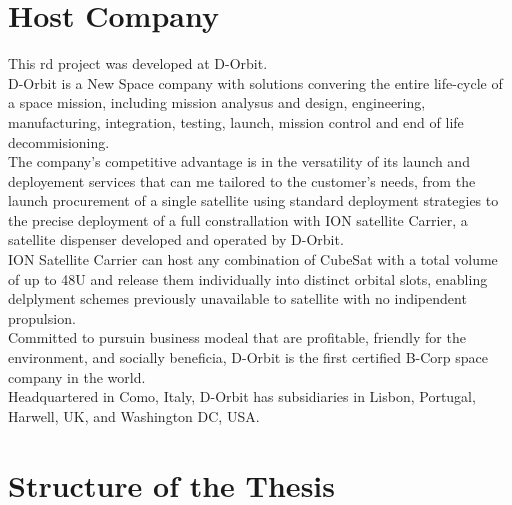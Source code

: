\section{Host Company}
This \acrshort{rd} project was developed at D-Orbit.\\
D-Orbit is a New Space company with solutions convering the entire life-cycle of a space mission, including mission analysus and design, engineering, manufacturing, integration, testing, launch, mission control and end of life decommisioning.\\
The company's competitive advantage is in the versatility of its launch and deployement services that can me tailored to the customer's needs, from the launch procurement of a single satellite using standard deployment strategies to the precise deployment of a full constrallation with ION satellite Carrier, a satellite dispenser developed and operated by D-Orbit.\\
ION Satellite Carrier can host any combination of CubeSat with a total volume of up to 48U and release them individually into distinct orbital slots, enabling delplyment schemes previously unavailable to satellite with no indipendent propulsion.\\
Committed to pursuin business modeal that are profitable, friendly for the environment, and socially beneficia, D-Orbit is the first certified B-Corp space company in the world.\\
Headquartered in Como, Italy, D-Orbit has subsidiaries in Lisbon, Portugal, Harwell, UK, and Washington DC, USA.\\

\section{Structure of the Thesis}
